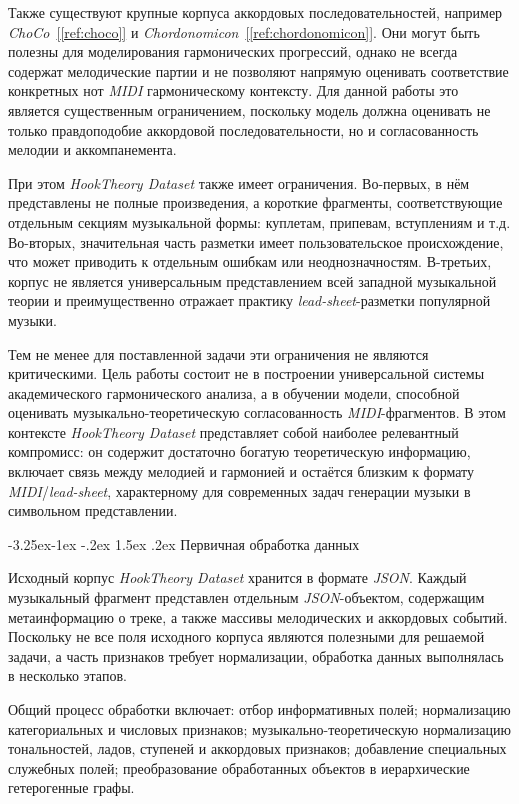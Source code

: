 \documentclass[a4paper,12pt]{extarticle}
\makeatletter
\newcommand{\sourcecite}[1]{\hyperref[#1]{[\ref*{#1}]}}
\renewcommand\subsection{\@startsection{subsection}{2}{\z@}%
  {-3.25ex\@plus -1ex \@minus -.2ex}%
  {1.5ex \@plus .2ex}%
  {\normalfont\large\bfseries\Needspace{6\baselineskip}}}
\makeatother
\begin{document}
Также существуют крупные корпуса аккордовых последовательностей, например \textit{ChoCo}~\sourcecite{ref:choco} и \textit{Chordonomicon}~\sourcecite{ref:chordonomicon}. Они могут быть полезны для моделирования гармонических прогрессий, однако не всегда содержат мелодические партии и не позволяют напрямую оценивать соответствие конкретных нот \textit{MIDI} гармоническому контексту. Для данной работы это является существенным ограничением, поскольку модель должна оценивать не только правдоподобие аккордовой последовательности, но и согласованность мелодии и аккомпанемента.

При этом \textit{HookTheory Dataset} также имеет ограничения. Во-первых, в нём представлены не полные произведения, а короткие фрагменты, соответствующие отдельным секциям музыкальной формы: куплетам, припевам, вступлениям и т.д. Во-вторых, значительная часть разметки имеет пользовательское происхождение, что может приводить к отдельным ошибкам или неоднозначностям. В-третьих, корпус не является универсальным представлением всей западной музыкальной теории и преимущественно отражает практику \textit{lead-sheet}-разметки популярной музыки.

Тем не менее для поставленной задачи эти ограничения не являются критическими. Цель работы состоит не в построении универсальной системы академического гармонического анализа, а в обучении модели, способной оценивать музыкально-теоретическую согласованность \textit{MIDI}-фрагментов. В этом контексте \textit{HookTheory Dataset} представляет собой наиболее релевантный компромисс: он содержит достаточно богатую теоретическую информацию, включает связь между мелодией и гармонией и остаётся близким к формату \textit{MIDI}/\textit{lead-sheet}, характерному для современных задач генерации музыки в символьном представлении.

\subsection{Первичная обработка данных}

Исходный корпус \textit{HookTheory Dataset} хранится в формате \textit{JSON}. Каждый музыкальный фрагмент представлен отдельным \textit{JSON}-объектом, содержащим метаинформацию о треке, а также массивы мелодических и аккордовых событий. Поскольку не все поля исходного корпуса являются полезными для решаемой задачи, а часть признаков требует нормализации, обработка данных выполнялась в несколько этапов.

Общий процесс обработки включает: отбор информативных полей; нормализацию категориальных и числовых признаков; музыкально-теоретическую нормализацию тональностей, ладов, ступеней и аккордовых признаков; добавление специальных служебных полей; преобразование обработанных объектов в иерархические гетерогенные графы.
\end{document}
